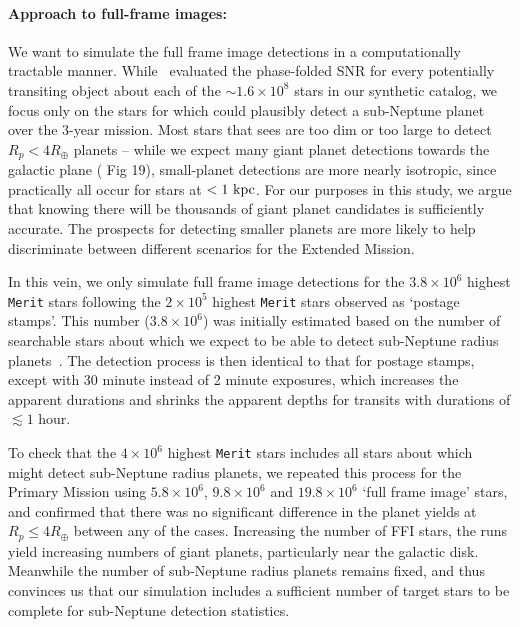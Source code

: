 \paragraph{Approach to full-frame images:}
\label{sec:FFI_simulation}
We want to simulate the full frame image detections in a
computationally tractable manner.  While~
evaluated the phase-folded SNR for every potentially transiting object
about each of the $\sim\!1.6\times10^8$ stars in our synthetic catalog,
we focus only on the stars for which \tess could plausibly detect a
sub-Neptune planet over the 3-year mission.  Most stars that
\tess sees are too dim or too large to detect $R_p<4R_\oplus$ planets
-- while we expect many giant planet detections towards the galactic
plane ( Fig 19), small-planet detections are
more nearly isotropic, since practically all occur for stars at
$<1\rm\ kpc$.  For our purposes in this study, we argue that knowing
there will be thousands of giant planet candidates is sufficiently
accurate. The prospects for detecting smaller planets are more likely
to help discriminate between different scenarios for the Extended Mission.

In this vein, we only simulate full frame image detections for the
$3.8\times10^6$ highest \texttt{Merit} stars following the
$2\times10^5$ highest \texttt{Merit} stars observed as `postage
stamps'.  This number ($3.8\times10^6$) was initially estimated based
on the number of searchable stars about which we expect \tess to be
able to detect sub-Neptune radius
planets~\citep{winn_searchable_2013}.  The detection process is then
identical to that for postage stamps, except with 30 minute instead of
2 minute exposures, which increases the apparent durations and shrinks
the apparent depths for transits with durations of $\lesssim 1$ hour.

To check that the $4\times10^6$ highest \texttt{Merit} stars includes 
all stars about which \tess might detect sub-Neptune radius planets, 
we repeated this process for the Primary Mission using $5.8\times10^6$,
$9.8\times10^6$ and $19.8\times10^6$ `full frame image' stars, and
confirmed that there was no significant difference in the planet
yields at $R_p\le4R_\oplus$ between any of the cases.
Increasing the number of FFI stars, the runs yield
increasing numbers of giant planets, particularly near the galactic
disk.  Meanwhile the number of sub-Neptune radius planets remains
fixed, and thus convinces us that our simulation includes a sufficient
number of target stars to be complete for sub-Neptune detection statistics.
